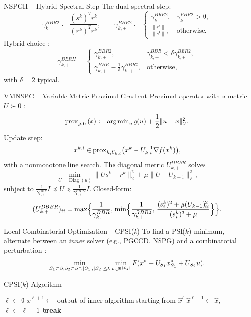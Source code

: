 \begin{frame}{NSPGH – Hybrid Spectral Step}
The dual spectral step:
\begin{equation} \label{BBR2}
\gamma_k^{BBR2} \coloneqq \frac{(s^k)^T r^k}{(r^k)^T r^k},\qquad
\gamma_{k,+}^{BBR2} \coloneqq \begin{cases}
\gamma_k^{BBR2}, & \gamma_k^{BBR2} > 0,\\
\frac{\|r^k\|}{\|s^k\|}, & \text{otherwise}.
\end{cases}
\end{equation}
Hybrid choice \cite{hibrido1,hibrido2}:
\[
\gamma^{BBRH}_{k,+} = 
\begin{cases}
\gamma^{BBR2}_{k,+}, & \gamma^{BBR}_{k,+} < \delta \gamma^{BBR2}_{k,+},\\[4pt]
\gamma^{BBR}_{k,+} - \frac{1}{\delta} \gamma^{BBR2}_{k,+}, & \text{otherwise},
\end{cases}
\]
with $\delta=2$ typical.
\end{frame}

\begin{frame}{VMNSPG – Variable Metric Proximal Gradient}
Proximal operator with a metric $U \succ 0$ \cite{vmspg}:
\[
\operatorname{prox}_{g,U}(x) \coloneqq \operatorname{arg\,min}_{u} g(u) + \frac{1}{2}\|u-x\|_U^2.
\]
Update step:
\[
x^{k,i} \in \operatorname{prox}_{h, U_{k,i}}\bigl(x^k - U_{k,i}^{-1} \nabla f(x^k)\bigr),
\]
with a nonmonotone line search. The diagonal metric $U_{k,+}^{DBBR}$ solves
\[
\min_{U=\operatorname{Diag}(u)} \|U s^k - r^k\|_2^2 + \mu \|U-U_{k-1}\|_F^2,
\]
subject to $\frac{1}{\gamma^{BBR}_{k,+}} I \preceq U \preceq \frac{1}{\gamma^{BBR2}_{k,+}} I$.
Closed-form:
\[
(U_{k,+}^{DBBR})_{ii} = \max\Bigl\{\frac{1}{\gamma^{BBR}_{k,+}},\,
\min\Bigl\{\frac{1}{\gamma^{BBR2}_{k,+}},\,
\frac{(s_i^k)^2 + \mu (U_{k-1})_{ii}^2}{(s_i^k)^2 + \mu}\Bigr\}\Bigr\}.
\]
\end{frame}

\begin{frame}{Local Combinatorial Optimization – CPSI($k$)}
To find a PSI($k$) minimum, alternate between an \textit{inner} solver (e.g., PGCCD, NSPG) and a combinatorial perturbation \cite{fastselect}:
\begin{equation} \label{psik}
\min_{S_1 \subset S, S_2 \subset S^c, |S_1|,|S_2| \le k} \min_{u \in \mathbb{R}^{|S_2|}} F(x^* - U_{S_1}x^*_{S_1} + U_{S_2}u).
\end{equation}
\end{frame}

\begin{frame}{CPSI($k$) Algorithm}
\begin{algorithm}[H]
\caption{CPSI($k$) Method}
\begin{algorithmic}[1]
\State $\ell \gets 0$
\State $\hat{x}^{\ell+1} \gets$ output of inner algorithm starting from $\hat{x}^\ell$
\State $\hat{x}^{\ell+1} \gets \hat{x}$, $\ell \gets \ell+1$
\Else \textbf{break}
\EndIf
\EndWhile
{}
\end{algorithmic}
\end{algorithm}
\end{frame}


